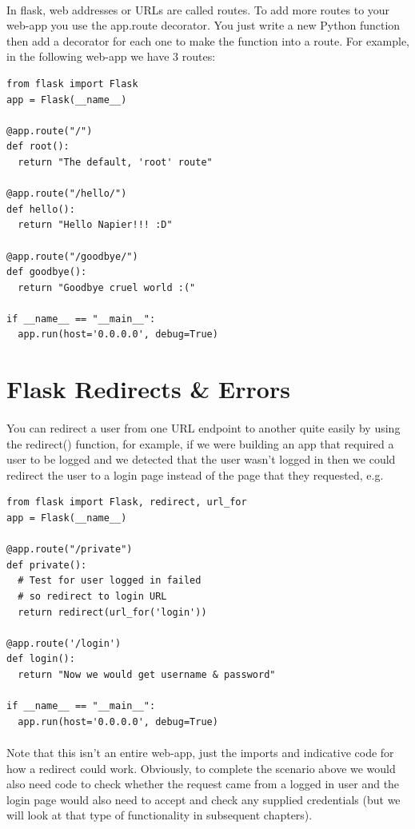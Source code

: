 \documentclass[12pt, a4paper, oneside]{book}
\begin{document}
\paragraph{} In flask, web addresses or URLs are called routes. To add more routes to your web-app you use the app.route decorator. You just write a new Python function then add a decorator for each one to make the function into a route. For example, in the following web-app we have 3 routes:

\begin{lstlisting}
from flask import Flask
app = Flask(__name__)

@app.route("/")
def root():
  return "The default, 'root' route"

@app.route("/hello/")
def hello():
  return "Hello Napier!!! :D"

@app.route("/goodbye/")
def goodbye():
  return "Goodbye cruel world :("

if __name__ == "__main__":
  app.run(host='0.0.0.0', debug=True)
\end{lstlisting}

\section{Flask Redirects \& Errors}
\label{errors}
\paragraph{} You can redirect a user from one URL endpoint to another quite easily by using the redirect() function, for example, if we were building an app that required a user to be logged and we detected that the user wasn't logged in then we could redirect the user to a login page instead of the page that they requested, e.g.

\begin{lstlisting}
from flask import Flask, redirect, url_for
app = Flask(__name__)

@app.route("/private")
def private():
  # Test for user logged in failed
  # so redirect to login URL
  return redirect(url_for('login'))

@app.route('/login')
def login():
  return "Now we would get username & password"

if __name__ == "__main__":
  app.run(host='0.0.0.0', debug=True)
\end{lstlisting}
\paragraph{} Note that this isn't an entire web-app, just the imports and indicative code for how a redirect could work. Obviously, to complete the scenario above we would also need code to check whether the request came from a logged in user and the login page would also need to accept and check any supplied credentials (but we will look at that type of functionality in subsequent chapters). 
\end{document}
